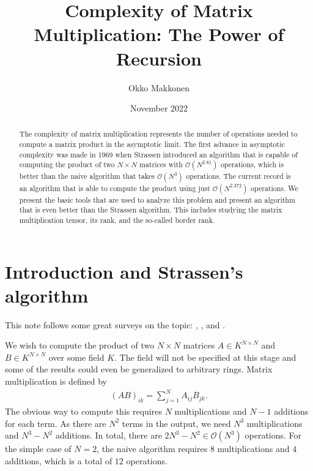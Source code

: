 \documentclass{article}
\title{Complexity of Matrix Multiplication: The Power of Recursion}
\author{Okko Makkonen}
\date{November 2022}
\theoremstyle{plain}
\theoremstyle{definition}
\theoremstyle{remark}
\begin{document}
\maketitle

\begin{abstract}
    The complexity of matrix multiplication represents the number of operations needed to compute a matrix product in the asymptotic limit. The first advance in asymptotic complexity was made in 1969 when Strassen introduced an algorithm that is capable of computing the product of two $N \times N$ matrices with $\mathcal{O}(N^{2.81})$ operations, which is better than the naive algorithm that takes $\mathcal{O}(N^3)$ operations. The current record is an algorithm that is able to compute the product using just $\mathcal{O}(N^{2.372})$ operations. We present the basic tools that are used to analyze this problem and present an algorithm that is even better than the Strassen algorithm. This includes studying the matrix multiplication tensor, its rank, and the so-called border rank.
\end{abstract}

\section{Introduction and Strassen's algorithm}

This note follows some great surveys on the topic: \cite{pan1984how}, \cite{stothers2010complexity}, and \cite{blaeser2013fast}. 

We wish to compute the product of two $N \times N$ matrices $A \in K^{N \times N}$ and $B \in K^{N \times N}$ over some field $K$. The field will not be specified at this stage and some of the results could even be generalized to arbitrary rings. Matrix multiplication is defined by
\begin{align*}
    (AB)_{ik} = \sum_{j=1}^N A_{ij} B_{jk}.
\end{align*}
The obvious way to compute this requires $N$ multiplications and $N - 1$ additions for each term. As there are $N^2$ terms in the output, we need $N^3$ multiplications and $N^3 - N^2$ additions. In total, there are $2N^3 - N^2 \in \mathcal{O}(N^3)$ operations. For the simple case of $N = 2$, the naive algorithm requires $8$ multiplications and $4$ additions, which is a total of $12$ operations.
\end{document}
